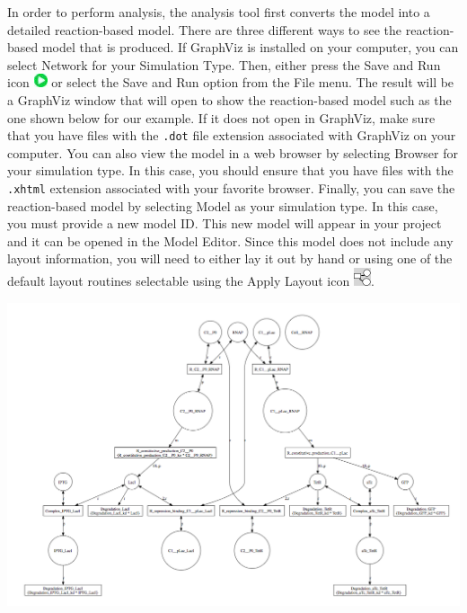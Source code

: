 \documentclass[titlepage,11pt]{article}
\begin{document}
In order to perform analysis, the analysis tool first converts the model into a detailed reaction-based model.  There are three different ways to see the reaction-based model that is produced.  If GraphViz is installed on your computer, you can select Network for your Simulation Type.  Then, either press the Save and Run icon \includegraphics{../gui/icons/run-icon} or select the Save and Run option from the File menu.  The result will be a GraphViz window that will open to show the reaction-based model such as the one shown below for our example.  If it does not open in GraphViz, make sure that you have files with the {\tt .dot} file extension associated with GraphViz on your computer.  You can also view the model in a web browser by selecting Browser for your simulation type.  In this case, you should ensure that you have files with the {\tt .xhtml} extension associated with your favorite browser.  Finally, you can save the reaction-based model by selecting Model as your simulation type.  In this case, you must provide a new model ID.  This new model will appear in your project and it can be opened in the Model Editor.  Since this model does not include any layout information, you will need to either lay it out by hand or using one of the default layout routines selectable using the Apply Layout icon    \includegraphics{../gui/icons/modelview/choose_layout_selected}.

\begin{center}
\includegraphics[width=160mm]{screenshots/viewNetworkGT}
\end{center}
\end{document}
